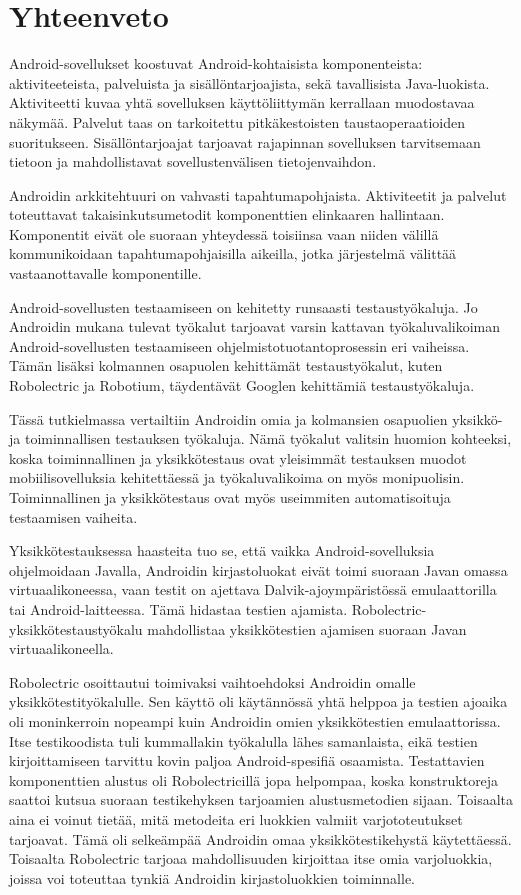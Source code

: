 \section{Yhteenveto}

Android-sovellukset koostuvat Android-kohtaisista komponenteista: aktiviteeteista, palveluista ja sisällöntarjoajista, sekä tavallisista Java-luokista. Aktiviteetti kuvaa yhtä sovelluksen käyttöliittymän kerrallaan muodostavaa näkymää. Palvelut taas on tarkoitettu pitkäkestoisten taustaoperaatioiden suoritukseen. Sisällöntarjoajat tarjoavat rajapinnan sovelluksen tarvitsemaan tietoon ja mahdollistavat sovellustenvälisen tietojenvaihdon.

Androidin arkkitehtuuri on vahvasti tapahtumapohjaista. Aktiviteetit ja palvelut toteuttavat takaisinkutsumetodit komponenttien elinkaaren hallintaan. Komponentit eivät ole suoraan yhteydessä toisiinsa vaan niiden välillä kommunikoidaan tapahtumapohjaisilla aikeilla, jotka järjestelmä välittää vastaanottavalle komponentille.

Android-sovellusten testaamiseen on kehitetty runsaasti testaustyökaluja. Jo Androidin mukana tulevat työkalut tarjoavat varsin kattavan työkaluvalikoiman Android-sovellusten testaamiseen ohjelmistotuotantoprosessin eri vaiheissa. Tämän lisäksi kolmannen osapuolen kehittämät testaustyökalut, kuten Robolectric ja Robotium, täydentävät Googlen kehittämiä testaustyökaluja.

Tässä tutkielmassa vertailtiin Androidin omia ja kolmansien osapuolien yksikkö- ja toiminnallisen testauksen työkaluja. Nämä työkalut valitsin huomion kohteeksi, koska toiminnallinen ja yksikkötestaus ovat yleisimmät testauksen muodot mobiilisovelluksia kehitettäessä ja työkaluvalikoima on myös monipuolisin. Toiminnallinen ja yksikkötestaus ovat myös useimmiten automatisoituja testaamisen vaiheita.

Yksikkötestauksessa haasteita tuo se, että vaikka Android-sovelluksia ohjelmoidaan Javalla, Androidin kirjastoluokat eivät toimi suoraan Javan omassa virtuaalikoneessa, vaan testit on ajettava Dalvik-ajoympäristössä emulaattorilla tai Android-laitteessa. Tämä hidastaa testien ajamista. Robolectric-yksikkötestaustyökalu mahdollistaa yksikkötestien ajamisen suoraan Javan virtuaalikoneella. 

Robolectric osoittautui toimivaksi vaihtoehdoksi Androidin omalle yksikkötestityökalulle. Sen käyttö oli käytännössä yhtä helppoa ja testien ajoaika oli moninkerroin nopeampi kuin Androidin omien yksikkötestien emulaattorissa. Itse testikoodista tuli kummallakin työkalulla lähes samanlaista, eikä testien kirjoittamiseen tarvittu kovin paljoa Android-spesifiä osaamista. Testattavien komponenttien alustus oli Robolectricillä jopa helpompaa, koska konstruktoreja saattoi kutsua suoraan testikehyksen tarjoamien alustusmetodien sijaan. Toisaalta aina ei voinut tietää, mitä metodeita eri luokkien valmiit varjototeutukset tarjoavat. Tämä oli selkeämpää Androidin omaa yksikkötestikehystä käytettäessä. Toisaalta Robolectric tarjoaa mahdollisuuden kirjoittaa itse omia varjoluokkia, joissa voi toteuttaa tynkiä Androidin kirjastoluokkien toiminnalle. 

